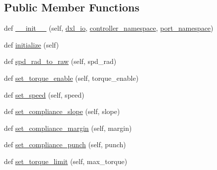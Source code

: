 \subsection*{Public Member Functions}
\begin{DoxyCompactItemize}
\item 
def \hyperlink{classdynamixel__controllers_1_1joint__torque__controller_1_1_joint_torque_controller_a35fda9520a2a728c7f1c40d5d8c83f13}{\+\_\+\+\_\+init\+\_\+\+\_\+} (self, \hyperlink{classdynamixel__controllers_1_1joint__controller_1_1_joint_controller_a8be2fb1ed88aee6590c938122361c780}{dxl\+\_\+io}, \hyperlink{classdynamixel__controllers_1_1joint__controller_1_1_joint_controller_a8b34f86e463a0ce3fcf52a09b6ea7dc2}{controller\+\_\+namespace}, \hyperlink{classdynamixel__controllers_1_1joint__controller_1_1_joint_controller_ac89de71afa48761fb662ac2917a5b9d3}{port\+\_\+namespace})
\item 
def \hyperlink{classdynamixel__controllers_1_1joint__torque__controller_1_1_joint_torque_controller_aa8caaf49515f747d5d4142b07be803f5}{initialize} (self)
\item 
def \hyperlink{classdynamixel__controllers_1_1joint__torque__controller_1_1_joint_torque_controller_ac5eb1af408da423a97956bc896859db4}{spd\+\_\+rad\+\_\+to\+\_\+raw} (self, spd\+\_\+rad)
\item 
def \hyperlink{classdynamixel__controllers_1_1joint__torque__controller_1_1_joint_torque_controller_a0921e3dc8fe7e5c5f48ea449a64b03a0}{set\+\_\+torque\+\_\+enable} (self, torque\+\_\+enable)
\item 
def \hyperlink{classdynamixel__controllers_1_1joint__torque__controller_1_1_joint_torque_controller_a4bd0cb20fdf14a34c2dfd0eaada3d925}{set\+\_\+speed} (self, speed)
\item 
def \hyperlink{classdynamixel__controllers_1_1joint__torque__controller_1_1_joint_torque_controller_a1ec30f51c9c3409a24232af3c50d8fe2}{set\+\_\+compliance\+\_\+slope} (self, slope)
\item 
def \hyperlink{classdynamixel__controllers_1_1joint__torque__controller_1_1_joint_torque_controller_a69b63d49faf52179c247f0a101946ae6}{set\+\_\+compliance\+\_\+margin} (self, margin)
\item 
def \hyperlink{classdynamixel__controllers_1_1joint__torque__controller_1_1_joint_torque_controller_a317a410b656b15c5b0066622a8991f11}{set\+\_\+compliance\+\_\+punch} (self, punch)
\item 
def \hyperlink{classdynamixel__controllers_1_1joint__torque__controller_1_1_joint_torque_controller_a557b0cbe66a2423b4b342922d90347fa}{set\+\_\+torque\+\_\+limit} (self, max\+\_\+torque)

\end{DoxyCompactItemize}
